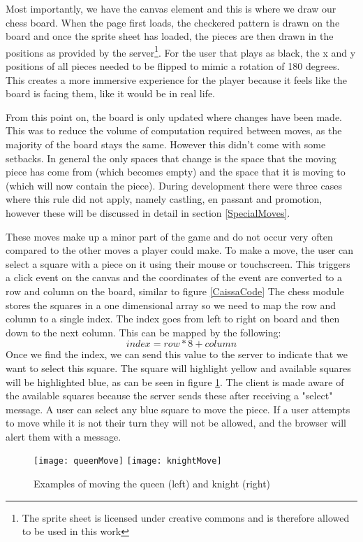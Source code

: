 Most importantly, we have the canvas element and this is where we draw our chess board. When the page first loads, the checkered pattern is drawn on the board and once the sprite sheet \cite{SpriteSheet} has loaded, the pieces are then drawn in the positions as provided by the server\footnote{The sprite sheet is licensed under creative commons and is therefore allowed to be used in this work}. For the user that plays as black, the x and y positions of all pieces needed to be flipped to mimic a rotation of 180 degrees. This creates a more immersive experience for the player because it feels like the board is facing them, like it would be in real life.

From this point on, the board is only updated where changes have been made. This was to reduce the volume of computation required between moves, as the majority of the board stays the same. However this didn't come with some setbacks. In general the only spaces that change is the space that the moving piece has come from (which becomes empty) and the space that it is moving to (which will now contain the piece). During development there were three cases where this rule did not apply, namely castling, en passant and promotion, however these will be discussed in detail in section \ref{SpecialMoves}.

These moves make up a minor part of the game and do not occur very often compared to the other moves a player could make. To make a move, the user can select a square with a piece on it using their mouse or touchscreen. This triggers a click event on the canvas and the coordinates of the event are converted to a row and column on the board, similar to figure \ref{CaissaCode} The chess module stores the squares in a one dimensional array so we need to map the row and column to a single index. The index goes from left to right on board and then down to the next column. This can be mapped by the following:$$index = row * 8 + column$$Once we find the index, we can send this value to the server to indicate that we want to select this square. The square will highlight yellow and available squares will be highlighted blue, as can be seen in figure \ref{exampleMove}. The client is made aware of the available squares because the server sends these after receiving a "select" message. A user can select any blue square to move the piece. If a user attempts to move while it is not their turn they will not be allowed, and the browser will alert them with a message.

\begin{figure}
    \begin{center}
        \texttt{[image: queenMove]}
        \texttt{[image: knightMove]}
        \caption{Examples of moving the queen (left) and knight (right)}
        \label{exampleMove}
    \end{center}
\end{figure}

